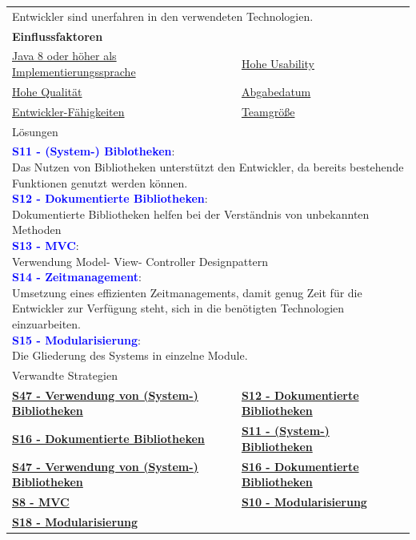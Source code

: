 \documentclass[enabledeprecatedfontcommands,fontsize=11pt,paper=a4,twoside]{scrartcl}
\newcounter{one}
\newcommand{\cb}[1]{{\textcolor{blue}{#1}}}
\begin{document}
	\begin{tabular} {|p{8cm} p{8cm}|}
		\hline
		\rowcolor{prob}\multicolumn{2}{|l|}{\parbox{16cm}{\textbf{05: Unerfahrene Entwickler}}} \\  \hline\hline 
		\multicolumn{2}{|l|}{\parbox{16cm}{Entwickler sind unerfahren in den verwendeten Technologien.}}\rule{0pt}{1ex}\\ \hline
		\multicolumn{2}{|l|}{\textbf{Einflussfaktoren}}\\
		\hyperlink{b}{Java 8 oder höher als Implementierungssprache} &
		\hyperlink {g}{Hohe Usability}\\
		\hyperlink {h}{Hohe Qualität}&
		\hyperlink {uu}{Abgabedatum} \\
		\hyperlink {vv}{Entwickler-Fähigkeiten} &
		\hyperlink {xx}{Teamgröße} 
		\\ \hline
		\multicolumn{2}{|l|}{Lösungen} \\
		\multicolumn{2}{|l|}{\parbox{16cm}{
				\textbf{\cb{\hypertarget{ccc}{S11 - (System-) Biblotheken}}}: \\
				Das Nutzen von Bibliotheken unterstützt den Entwickler, da bereits bestehende Funktionen genutzt werden können.\\
				\textbf{\cb{\hypertarget{aaaf}{S12 - Dokumentierte Bibliotheken}}}: \\
				Dokumentierte Bibliotheken helfen bei der Verständnis von unbekannten Methoden \\
				\textbf{\cb{\hypertarget{modelviewcontroller}{S13 - MVC}}}: \\
				Verwendung Model- View- Controller Designpattern\\
				\textbf{\cb{\hypertarget{zeitmanagement}{S14 - Zeitmanagement}}}: \\
				Umsetzung eines effizienten Zeitmanagements, damit genug Zeit für die Entwickler zur Verfügung steht, sich in die benötigten Technologien einzuarbeiten.\\
				\textbf{\cb{\hypertarget{aabb}{S15 - Modularisierung}}}: \\%
				Die Gliederung des Systems in einzelne Module.
		} }\\ [9ex] \hline
		\multicolumn{2}{|l|}{Verwandte Strategien} \\
		\textbf{\hyperlink {qqq}{S47 - Verwendung von (System-) Bibliotheken}} &
		\textbf{\hyperlink {aaaf}{S12 - Dokumentierte Bibliotheken}} \\
		\textbf{\hyperlink {ddd}{S16 - Dokumentierte Bibliotheken}} &
		\textbf{\hyperlink {ccc}{S11 - (System-) Bibliotheken}} \\
		\textbf{\hyperlink {qqq}{S47 - Verwendung von (System-) Bibliotheken}}& 
		\textbf{\hyperlink {ddd}{S16 - Dokumentierte Bibliotheken}} \\
		\textbf{\hyperlink {bbb}{S8 - MVC}} &
		\textbf{\hyperlink {aadd}{S10 - Modularisierung}} \\
		\textbf{\hyperlink {aacc}{S18 - Modularisierung}} &
		\\\hline
	\end{tabular}\\ \\ \\
\end{document}
